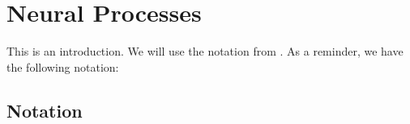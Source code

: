 \documentclass[../main.tex]{subfiles}
\begin{document}



\section{Neural Processes}

This is an introduction.
We will use the notation from \cite{garnelo2018neural}. As a reminder, we have the following notation:

\subsection{Notation}


\end{document}
